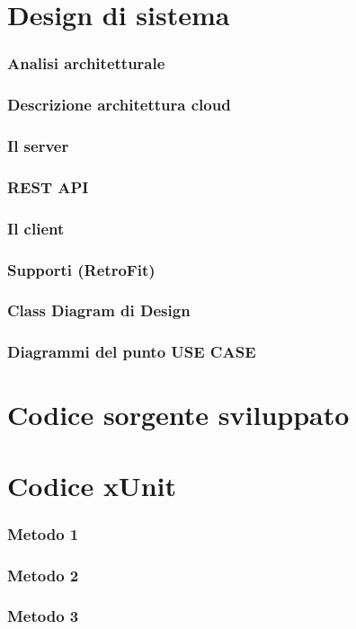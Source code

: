 \documentclass{article}
\begin{document}
	\section{Design di sistema}
		\subsubsection{Analisi architetturale}
		\subsubsection{Descrizione architettura cloud}
		\subsubsection{Il server}
		\subsubsection{REST API}
		\subsubsection{Il client}
		\subsubsection{Supporti (RetroFit)}
		\subsubsection{Class Diagram di Design}
			\subsubsection{Diagrammi del punto USE CASE}
	\section{Codice sorgente sviluppato}
	\section{Codice xUnit}
		\subsubsection{Metodo 1}
		\subsubsection{Metodo 2}
		\subsubsection{Metodo 3}
\end{document}
